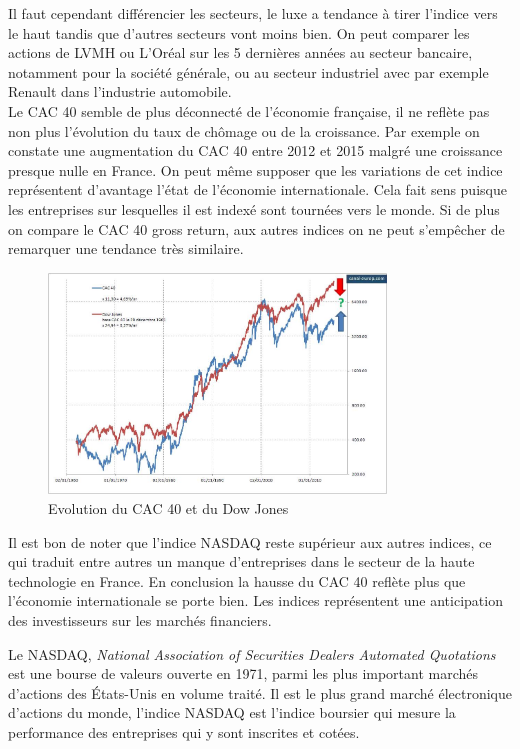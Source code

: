 \documentclass[main.tex]{subfiles}
\begin{document}
Il faut cependant différencier les secteurs, le luxe a tendance à tirer l'indice vers le haut tandis que d'autres secteurs vont moins bien. On peut comparer les actions de LVMH ou L'Oréal sur les 5 dernières années au secteur bancaire, notamment pour la société générale, ou au secteur industriel avec par exemple Renault dans l'industrie automobile. \\ 

Le CAC 40 semble de plus déconnecté de l'économie française, il ne reflète pas non plus l'évolution du taux de chômage ou de la croissance. Par exemple on constate une augmentation du CAC 40 entre 2012 et 2015 malgré une croissance presque nulle en France. On peut même supposer que les variations de cet indice représentent d'avantage l'état de l'économie internationale. Cela fait sens puisque les entreprises sur lesquelles il est indexé sont tournées vers le monde. Si de plus on compare le CAC 40 gross return, aux autres indices on ne peut s'empêcher de remarquer une tendance très similaire. 

\begin{figure}[htpb]
        \centering
        \includegraphics[width=0.8\textwidth]{CAC_DJ.jpg}
        \caption{Evolution du CAC 40 et du Dow Jones}
        \label{fig:CAC_DJ-jpg}
\end{figure}

Il est bon de noter que l'indice NASDAQ reste supérieur aux autres indices, ce qui traduit entre autres un manque d'entreprises dans le secteur de la haute technologie en France. En conclusion la hausse du CAC 40 reflète plus que l'économie internationale se porte bien. Les indices représentent une anticipation des investisseurs sur les marchés financiers.

\begin{definition}
        Le NASDAQ, \emph{National Association of Securities Dealers Automated Quotations} est une bourse de valeurs ouverte en 1971, parmi les plus important marchés d'actions des États-Unis en volume traité. Il est le plus grand marché électronique d'actions du monde, l'indice NASDAQ est l'indice boursier qui mesure la performance des entreprises qui y sont inscrites et cotées.
\end{definition}
\end{document}
